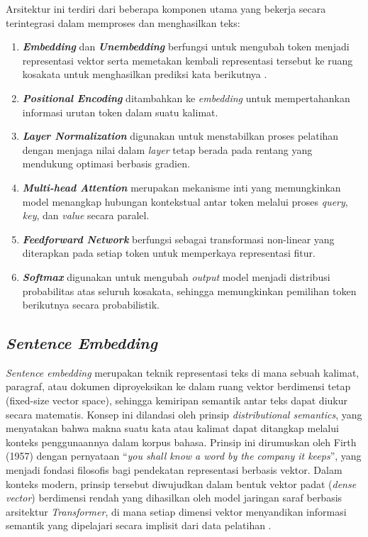 Arsitektur ini terdiri dari beberapa komponen utama yang bekerja secara terintegrasi dalam memproses dan menghasilkan teks:

\begin{enumerate}
	\item \textbf{\textit{Embedding}} dan \textbf{\textit{Unembedding}} berfungsi untuk mengubah token menjadi representasi vektor serta memetakan kembali representasi tersebut ke ruang kosakata untuk menghasilkan prediksi kata berikutnya \cite{jurafsky2026slp}.
	\item \textbf{\textit{Positional Encoding}} ditambahkan ke \textit{embedding} untuk mempertahankan informasi urutan token dalam suatu kalimat.
	\item \textbf{\textit{Layer Normalization}} digunakan untuk menstabilkan proses pelatihan dengan menjaga nilai dalam \textit{layer} tetap berada pada rentang yang mendukung optimasi berbasis gradien.
	\item \textbf{\textit{Multi-head Attention}} merupakan mekanisme inti yang memungkinkan model menangkap hubungan kontekstual antar token melalui proses \textit{query}, \textit{key}, dan \textit{value} secara paralel.
	\item \textbf{\textit{Feedforward Network}} berfungsi sebagai transformasi non-linear yang diterapkan pada setiap token untuk memperkaya representasi fitur.
	\item \textbf{\textit{Softmax}} digunakan untuk mengubah \textit{output} model menjadi distribusi probabilitas atas seluruh kosakata, sehingga memungkinkan pemilihan token berikutnya secara probabilistik.
\end{enumerate}

\subsection{\textit{Sentence Embedding}}

\textit{Sentence embedding} merupakan teknik representasi teks di mana sebuah kalimat, paragraf, atau dokumen diproyeksikan ke dalam ruang vektor berdimensi tetap (fixed-size vector space), sehingga kemiripan semantik antar teks dapat diukur secara matematis. Konsep ini dilandasi oleh prinsip \textit{distributional semantics}, yang menyatakan bahwa makna suatu kata atau kalimat dapat ditangkap melalui konteks penggunaannya dalam korpus bahasa. Prinsip ini dirumuskan oleh Firth (1957) dengan pernyataan ``\textit{you shall know a word by the company it keeps}'', yang menjadi fondasi filosofis bagi pendekatan representasi berbasis vektor. Dalam konteks modern, prinsip tersebut diwujudkan dalam bentuk vektor padat (\textit{dense vector}) berdimensi rendah yang dihasilkan oleh model jaringan saraf berbasis arsitektur \textit{Transformer}, di mana setiap dimensi vektor menyandikan informasi semantik yang dipelajari secara implisit dari data pelatihan \cite{jurafsky2026slp}.

